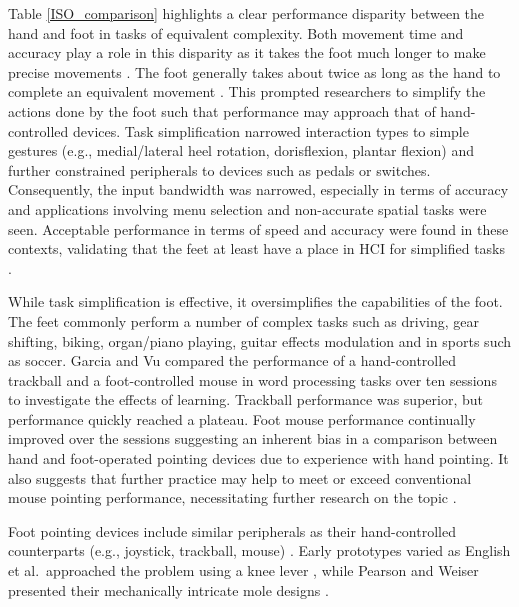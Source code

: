 \documentclass [12pt,letterpaper]{report}
\begin{document}
Table \ref{ISO_comparison} highlights a clear performance disparity between the hand and foot in tasks of equivalent complexity. Both movement time and accuracy play a role in this disparity as it takes the foot much longer to make precise movements  \cite{pakkanen2004appropriateness}. The foot generally takes about twice as long as the hand to complete an equivalent movement  \cite{hoffmann1991comparison}. This prompted researchers to simplify the actions done by the foot such that performance may approach that of hand-controlled devices. Task simplification narrowed interaction types to simple gestures (e.g., medial/lateral heel rotation, dorisflexion, plantar flexion) and further constrained peripherals to devices such as pedals or switches. Consequently, the input bandwidth was narrowed, especially in terms of accuracy and applications involving menu selection and non-accurate spatial tasks were seen. Acceptable performance in terms of speed and accuracy were found in these contexts, validating that the feet at least have a place in HCI for simplified tasks  \cite{pakkanen2004appropriateness,scott2010sensing,zhong2011foot,simeone2014feet}.

While task simplification is effective, it oversimplifies the capabilities of the foot. The feet commonly perform a number of complex tasks such as driving, gear shifting, biking, organ/piano playing, guitar effects modulation and in sports such as soccer. Garcia and Vu compared the performance of a hand-controlled trackball and a foot-controlled mouse in word processing tasks over ten sessions to investigate the effects of learning. Trackball performance was superior, but performance quickly reached a plateau. Foot mouse performance continually improved over the sessions suggesting an inherent bias in a comparison between hand and foot-operated pointing devices due to experience with hand pointing. It also suggests that further practice may help to meet or exceed conventional mouse pointing performance, necessitating further research on the topic \cite{garcia2011effectiveness,velloso2015feet}.

Foot pointing devices include similar peripherals as their hand-controlled counterparts (e.g., joystick, trackball, mouse) \cite{springer1996position,pakkanen2004appropriateness,ye2005shoe}. Early prototypes varied as English et al.\ approached the problem using a knee lever \cite{english1967display}, while Pearson and Weiser presented their mechanically intricate mole designs \cite{pearson1988exploratory}.
\end{document}
